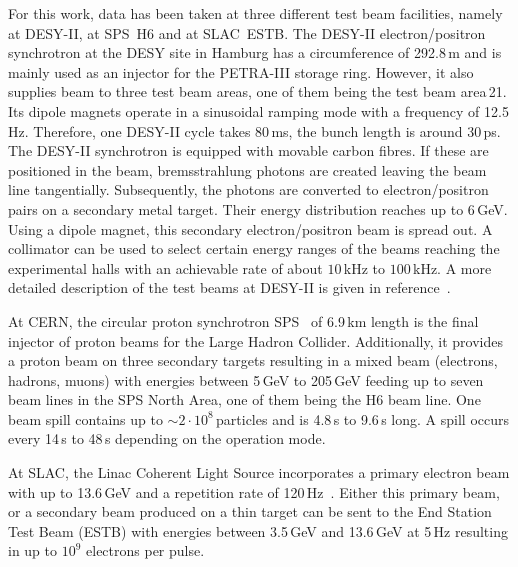 
For this work, data has been taken at three different test beam facilities, namely at {DESY-II}, at SPS~H6 and at SLAC~ESTB.
The DESY-II electron/positron synchrotron at the DESY site in Hamburg has a circumference of 292.8\,m and is mainly used as an injector for the PETRA-III storage ring. 
However, it also supplies beam to three test beam areas, one  of them being the test beam area\,21.
Its dipole magnets operate in a sinusoidal ramping mode with a frequency of 12.5\,Hz. 
Therefore, one DESY-II cycle takes 80\,ms, the bunch length is around 30\,ps. 
The DESY-II synchrotron is equipped with movable carbon fibres. 
If these are positioned in the beam, bremsstrahlung photons are created leaving the beam line tangentially.
Subsequently, the photons are converted to electron/positron pairs on a secondary metal target. 
Their energy distribution reaches up to 6\,GeV. 
Using a dipole magnet, this secondary electron/positron beam is spread out.
A collimator can be used to select certain energy ranges of the beams reaching the experimental halls with an achievable rate of about $10$\,kHz to $100$\,kHz. 
A more detailed description of the test beams at {DESY-II} is given in reference~\cite{EUDET-2007-11}.

At CERN, the circular proton synchrotron SPS~\cite{SPS} of 6.9\,km length is the final injector of proton beams for the Large Hadron Collider. 
Additionally, it provides a proton beam on three secondary targets resulting in a mixed beam (electrons, hadrons, muons) with energies between 5\,GeV to 205\,GeV
 feeding up to seven beam lines in the SPS North Area, one of them being the H6 beam line. 
One beam spill contains up to $\sim 2\cdot10^8$\,particles and is 4.8\,s to 9.6\,s long. 
A spill occurs every 14\,s to 48\,s depending on the operation mode. 

At SLAC, the Linac Coherent Light Source incorporates a primary electron beam with up to 13.6\,GeV and a repetition rate of 120\,Hz~\cite{SLAC}.
Either this primary beam, or a secondary beam produced on a thin target can be sent to the End Station Test Beam (ESTB) with energies between 3.5\,GeV and 13.6\,GeV at 5\,Hz
 resulting in up to $10^{9}$ electrons per pulse.

